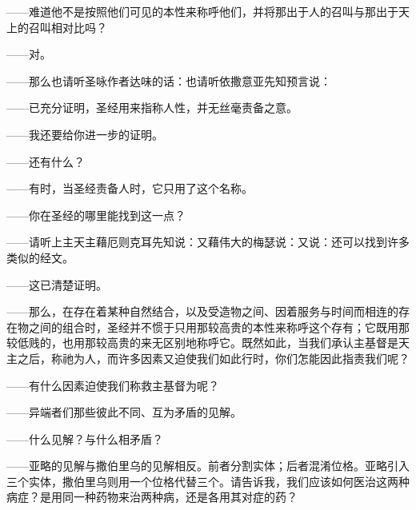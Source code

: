 ——难道他不是按照他们可见的本性来称呼他们，并将那出于人的召叫与那出于天上的召叫相对比吗？\par

——对。\par

——那么也请听圣咏作者达味的话：也请听依撒意亚先知预言说：\par

——已充分证明，圣经用来指称人性，并无丝毫责备之意。\par

——我还要给你进一步的证明。\par

——还有什么？\par

——有时，当圣经责备人时，它只用了这个名称。\par

——你在圣经的哪里能找到这一点？\par

——请听上主天主藉厄则克耳先知说：又藉伟大的梅瑟说：又说：还可以找到许多类似的经文。\par

——这已清楚证明。\par

——那么，在存在着某种自然结合，以及受造物之间、因着服务与时间而相连的存在物之间的组合时，圣经并不惯于只用那较高贵的本性来称呼这个存有；它既用那较低贱的，也用那较高贵的来无区别地称呼它。既然如此，当我们承认主基督是天主之后，称祂为人，而许多因素又迫使我们如此行时，你们怎能因此指责我们呢？\par

——有什么因素迫使我们称救主基督为呢？\par

——异端者们那些彼此不同、互为矛盾的见解。\par

——什么见解？与什么相矛盾？\par

——亚略的见解与撒伯里乌的见解相反。前者分割实体；后者混淆位格。亚略引入三个实体，撒伯里乌则用一个位格代替三个。请告诉我，我们应该如何医治这两种病症？是用同一种药物来治两种病，还是各用其对症的药？\par

